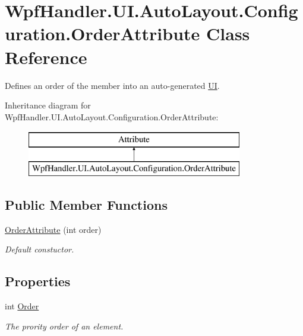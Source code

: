 \hypertarget{class_wpf_handler_1_1_u_i_1_1_auto_layout_1_1_configuration_1_1_order_attribute}{}\section{Wpf\+Handler.\+U\+I.\+Auto\+Layout.\+Configuration.\+Order\+Attribute Class Reference}
\label{class_wpf_handler_1_1_u_i_1_1_auto_layout_1_1_configuration_1_1_order_attribute}


Defines an order of the member into an auto-\/generated \mbox{\hyperlink{namespace_wpf_handler_1_1_u_i}{UI}}.  


Inheritance diagram for Wpf\+Handler.\+U\+I.\+Auto\+Layout.\+Configuration.\+Order\+Attribute\+:\begin{figure}[H]
\begin{center}
\leavevmode
\includegraphics[height=2.000000cm]{df/d2b/class_wpf_handler_1_1_u_i_1_1_auto_layout_1_1_configuration_1_1_order_attribute}
\end{center}
\end{figure}
\subsection*{Public Member Functions}
\begin{DoxyCompactItemize}
\item 
\mbox{\hyperlink{class_wpf_handler_1_1_u_i_1_1_auto_layout_1_1_configuration_1_1_order_attribute_a1cd880e2369a3a6be08d0ace9be115ab}{Order\+Attribute}} (int order)
\begin{DoxyCompactList}\small\item\em Default constuctor. \end{DoxyCompactList}\end{DoxyCompactItemize}
\subsection*{Properties}
\begin{DoxyCompactItemize}
\item 
int \mbox{\hyperlink{class_wpf_handler_1_1_u_i_1_1_auto_layout_1_1_configuration_1_1_order_attribute_af216fd2b8c66cf70d39b0904793c345a}{Order}}
\begin{DoxyCompactList}\small\item\em The prority order of an element. \end{DoxyCompactList}\end{DoxyCompactItemize}
